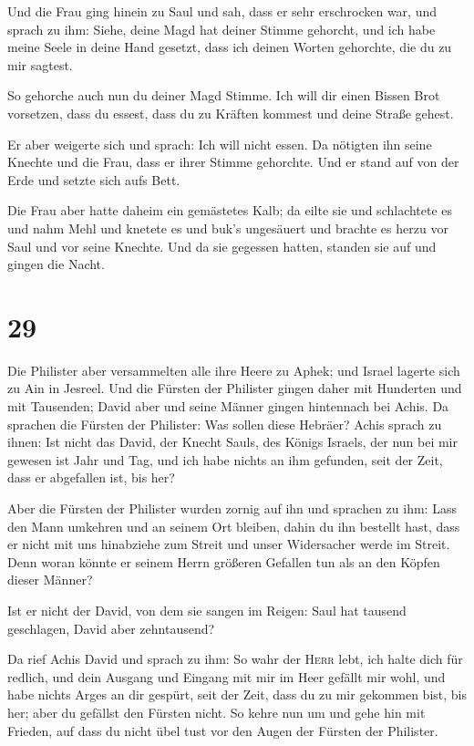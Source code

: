  Und die Frau ging hinein zu Saul und sah, dass er sehr
erschrocken war, und sprach zu ihm: Siehe, deine Magd hat deiner Stimme
gehorcht, und ich habe meine Seele in deine Hand gesetzt, dass ich
deinen Worten gehorchte, die du zu mir sagtest.

 So gehorche auch nun du deiner Magd Stimme. Ich will dir
einen Bissen Brot vorsetzen, dass du essest, dass du zu Kräften kommest
und deine Straße gehest.

 Er aber weigerte sich und sprach: Ich will nicht essen.
Da nötigten ihn seine Knechte und die Frau, dass er ihrer Stimme
gehorchte. Und er stand auf von der Erde und setzte sich aufs Bett.

 Die Frau aber hatte daheim ein gemästetes Kalb; da eilte
sie und schlachtete es und nahm Mehl und knetete es und buk's ungesäuert
 und brachte es herzu vor Saul und vor seine Knechte. Und
da sie gegessen hatten, standen sie auf und gingen die Nacht.

\hypertarget{section-28}{%
\section{29}\label{section-28}}

 Die Philister aber versammelten alle ihre Heere zu Aphek;
und Israel lagerte sich zu Ain in Jesreel.  Und die
Fürsten der Philister gingen daher mit Hunderten und mit Tausenden;
David aber und seine Männer gingen hintennach bei Achis. 
Da sprachen die Fürsten der Philister: Was sollen diese Hebräer? Achis
sprach zu ihnen: Ist nicht das David, der Knecht Sauls, des Königs
Israels, der nun bei mir gewesen ist Jahr und Tag, und ich habe nichts
an ihm gefunden, seit der Zeit, dass er abgefallen ist, bis her?

 Aber die Fürsten der Philister wurden zornig auf ihn und
sprachen zu ihm: Lass den Mann umkehren und an seinem Ort bleiben, dahin
du ihn bestellt hast, dass er nicht mit uns hinabziehe zum Streit und
unser Widersacher werde im Streit. Denn woran könnte er seinem Herrn
größeren Gefallen tun als an den Köpfen dieser Männer?

 Ist er nicht der David, von dem sie sangen im Reigen:
Saul hat tausend geschlagen, David aber zehntausend?

 Da rief Achis David und sprach zu ihm: So wahr der
\textsc{Herr} lebt, ich halte dich für redlich, und dein Ausgang und
Eingang mit mir im Heer gefällt mir wohl, und habe nichts Arges an dir
gespürt, seit der Zeit, dass du zu mir gekommen bist, bis her; aber du
gefällst den Fürsten nicht.  So kehre nun um und gehe hin
mit Frieden, auf dass du nicht übel tust vor den Augen der Fürsten der
Philister.

